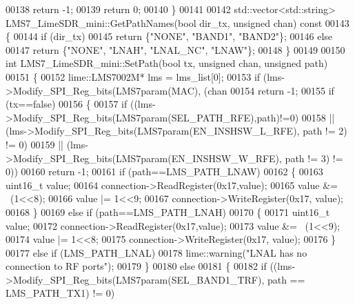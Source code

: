 \begin{DoxyCode}
00138         \textcolor{keywordflow}{return} -1;
00139     \textcolor{keywordflow}{return} 0;
00140 \}
00141 
00142 std::vector<std::string> LMS7_LimeSDR_mini::GetPathNames(\textcolor{keywordtype}{bool} dir_tx, \textcolor{keywordtype}{unsigned} 
      chan)\textcolor{keyword}{ const}
00143 \textcolor{keyword}{}\{
00144     \textcolor{keywordflow}{if} (dir\_tx)
00145         \textcolor{keywordflow}{return} \{\textcolor{stringliteral}{"NONE"}, \textcolor{stringliteral}{"BAND1"}, \textcolor{stringliteral}{"BAND2"}\};
00146     \textcolor{keywordflow}{else}
00147     \textcolor{keywordflow}{return} \{\textcolor{stringliteral}{"NONE"}, \textcolor{stringliteral}{"LNAH"}, \textcolor{stringliteral}{"LNAL\_NC"}, \textcolor{stringliteral}{"LNAW"}\};
00148 \}
00149 
00150 \textcolor{keywordtype}{int} LMS7_LimeSDR_mini::SetPath(\textcolor{keywordtype}{bool} tx, \textcolor{keywordtype}{unsigned} chan, \textcolor{keywordtype}{unsigned} path)
00151 \{
00152     lime::LMS7002M* lms = lms_list[0];
00153     \textcolor{keywordflow}{if} (lms->Modify_SPI_Reg_bits(LMS7param(MAC), (chan%
00154         \textcolor{keywordflow}{return} -1;
00155     \textcolor{keywordflow}{if} (tx==\textcolor{keyword}{false})
00156     \{
00157         \textcolor{keywordflow}{if} ((lms->Modify_SPI_Reg_bits(LMS7param(SEL_PATH_RFE),path)!=0)
00158         || (lms->Modify_SPI_Reg_bits(LMS7param(EN_INSHSW_L_RFE), path != 2) != 0)
00159         || (lms->Modify_SPI_Reg_bits(LMS7param(EN_INSHSW_W_RFE), path != 3) != 0))
00160             \textcolor{keywordflow}{return} -1;
00161         \textcolor{keywordflow}{if} (path==LMS_PATH_LNAW)
00162         \{
00163             uint16\_t value;
00164             connection->ReadRegister(0x17,value);
00165             value &= ~(1<<8);
00166             value |= 1<<9;
00167             connection->WriteRegister(0x17, value);
00168         \}
00169         \textcolor{keywordflow}{else} \textcolor{keywordflow}{if} (path==LMS_PATH_LNAH)
00170         \{
00171             uint16\_t value;
00172             connection->ReadRegister(0x17,value);
00173             value &= ~(1<<9);
00174             value |= 1<<8;
00175             connection->WriteRegister(0x17, value);
00176         \}
00177         \textcolor{keywordflow}{else} \textcolor{keywordflow}{if} (LMS_PATH_LNAL)
00178             lime::warning(\textcolor{stringliteral}{"LNAL has no connection to RF ports"});
00179     \}
00180     \textcolor{keywordflow}{else}
00181     \{
00182         \textcolor{keywordflow}{if} ((lms->Modify_SPI_Reg_bits(LMS7param(SEL_BAND1_TRF), path == 
      LMS_PATH_TX1) != 0)

\end{DoxyCode}

